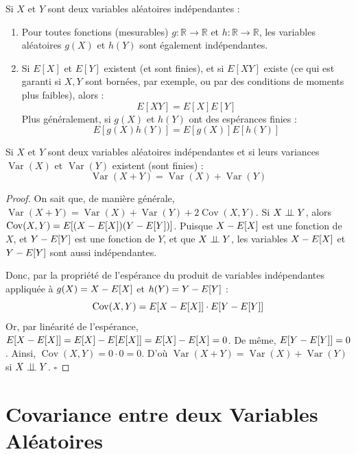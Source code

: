 \begin{proposition}
Si $X$ et $Y$ sont deux variables aléatoires indépendantes :
\begin{enumerate}
    \item Pour toutes fonctions (mesurables) $g : \mathbb{R} \to \mathbb{R}$ et $h : \mathbb{R} \to \mathbb{R}$, les variables aléatoires $g(X)$ et $h(Y)$ sont également indépendantes.
    \item Si $E[X]$ et $E[Y]$ existent (et sont finies), et si $E[XY]$ existe (ce qui est garanti si $X, Y$ sont bornées, par exemple, ou par des conditions de moments plus faibles), alors :
    \[
    E[XY] = E[X]E[Y]
    \]
    Plus généralement, si $g(X)$ et $h(Y)$ ont des espérances finies :
    \[
    E[g(X)h(Y)] = E[g(X)]E[h(Y)]
    \]
\end{enumerate}
\end{proposition}

\begin{proposition}
Si $X$ et $Y$ sont deux variables aléatoires indépendantes et si leurs variances $\operatorname{Var}(X)$ et $\operatorname{Var}(Y)$ existent (sont finies) :
\[
\operatorname{Var}(X + Y) = \operatorname{Var}(X) + \operatorname{Var}(Y)
\]
\end{proposition}
\begin{proof}
    
On sait que, de manière générale, $\operatorname{Var}(X+Y) = \operatorname{Var}(X) + \operatorname{Var}(Y) + 2\operatorname{Cov}(X, Y)$. 
Si $X \mathrel{\perp\!\!\!\perp} Y$, alors $\operatorname{Cov}(X, Y) = E[(X - E[X])(Y - E[Y])]$. Puisque $X - E[X]$ est une fonction de $X$, et $Y - E[Y]$ est une fonction de $Y$, et que $X \mathrel{\perp\!\!\!\perp} Y$, les variables $X - E[X]$ et $Y - E[Y]$ sont aussi indépendantes. 

Donc, par la propriété de l'espérance du produit de variables indépendantes appliquée à $g(X) = X - E[X]$ et $h(Y) = Y - E[Y]$ : 
\[ \operatorname{Cov}(X, Y) = E[X - E[X]] \cdot E[Y - E[Y]] \]
Or, par linéarité de l'espérance, $E[X - E[X]] = E[X] - E[E[X]] = E[X] - E[X] = 0$. De même, $E[Y - E[Y]] = 0$. 
Ainsi, $\operatorname{Cov}(X, Y) = 0 \cdot 0 = 0$. D'où $\operatorname{Var}(X + Y) = \operatorname{Var}(X) + \operatorname{Var}(Y)$ si $X \mathrel{\perp\!\!\!\perp} Y$. \hfill $\square$
\end{proof} 
\vspace{2em}

\section{Covariance entre deux Variables Aléatoires}

